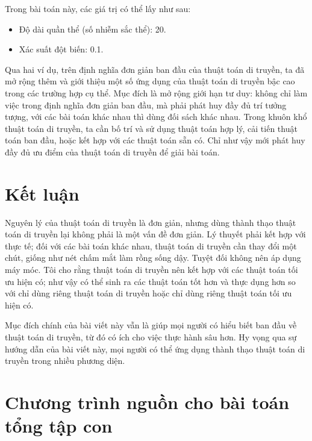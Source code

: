\documentclass[11pt]{article}
\begin{document}
Trong bài toán này, các giá trị có thể lấy như sau:
\begin{itemize}
  \item Độ dài quần thể (số nhiễm sắc thể): 20.
  \item Xác suất đột biến: 0.1.
\end{itemize}

Qua hai ví dụ, trên định nghĩa đơn giản ban đầu của thuật toán di truyền, ta
đã mở rộng thêm và giới thiệu một số ứng dụng của thuật toán di truyền bậc
cao trong các trường hợp cụ thể. Mục đích là mở rộng giới hạn tư duy: không
chỉ làm việc trong định nghĩa đơn giản ban đầu, mà phải phát huy đầy đủ trí
tưởng tượng, với các bài toán khác nhau thì dùng đối sách khác nhau. Trong
khuôn khổ thuật toán di truyền, ta cần bố trí và sử dụng thuật toán hợp lý,
cải tiến thuật toán ban đầu, hoặc kết hợp với các thuật toán sẵn có. Chỉ như
vậy mới phát huy đầy đủ ưu điểm của thuật toán di truyền để giải bài toán.

\section{Kết luận}

Nguyên lý của thuật toán di truyền là đơn giản, nhưng dùng thành thạo thuật
toán di truyền lại không phải là một vấn đề đơn giản. Lý thuyết phải kết hợp
với thực tế; đối với các bài toán khác nhau, thuật toán di truyền cần thay
đổi một chút, giống như nét chấm mắt làm rồng sống dậy. Tuyệt đối không nên
áp dụng máy móc. Tôi cho rằng thuật toán di truyền nên kết hợp với các thuật
toán tối ưu hiện có; như vậy có thể sinh ra các thuật toán tốt hơn và thực
dụng hơn so với chỉ dùng riêng thuật toán di truyền hoặc chỉ dùng riêng thuật
toán tối ưu hiện có.

Mục đích chính của bài viết này vẫn là giúp mọi người có hiểu biết ban đầu về
thuật toán di truyền, từ đó có ích cho việc thực hành sâu hơn. Hy vọng qua sự
hướng dẫn của bài viết này, mọi người có thể ứng dụng thành thạo thuật toán
di truyền trong nhiều phương diện.

\appendix

\section{Chương trình nguồn cho bài toán tổng tập con}
\end{document}
